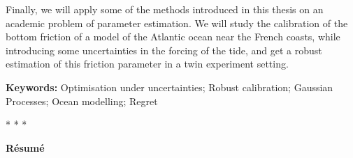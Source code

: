 \documentclass[12pt, a4paper]{article}
\begin{document}
Finally, we will apply some of the methods introduced in this thesis on an
academic problem of parameter estimation. We will study the
calibration of the bottom friction of a model of the Atlantic ocean
near the French coasts, while introducing some uncertainties in the
forcing of the tide, and get a robust estimation of this friction
parameter in a twin experiment setting.

\vspace{0.5cm}
\textbf{Keywords:} Optimisation under uncertainties; Robust
calibration; Gaussian Processes; Ocean modelling; Regret

%
%
%

\vspace{0.2cm}
\vfill
\begin{center}
* \hspace{2ex}* \hspace{2ex}*
\end{center}
\vfill
\vspace{0.2cm}
\begin{center}
\small  \bf Résumé
\end{center}
\vspace{0.3cm} 
\end{document}
